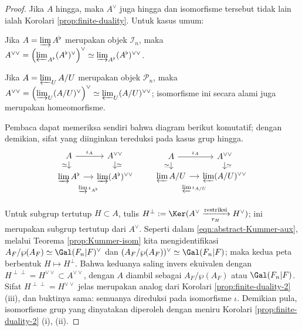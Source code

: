 \begin{proof}
	Jika $A$ hingga, maka $A^\vee$ juga hingga dan isomorfisme tersebut tidak lain ialah Korolari \ref{prop:finite-duality}. Untuk kasus umum:
	\begin{compactitem}
		\item Jika $A = \varinjlim A^\flat$ merupakan objek $\mathcal{I}_n$, maka $A^{\vee\vee} = \left( \varprojlim_{A^\flat} (A^\flat)^\vee\right)^\vee \simeq \varinjlim_{A^\flat} (A^\flat)^{\vee\vee}$.
		\item Jika $A = \varprojlim_U A/U$ merupakan objek $\mathcal{P}_n$, maka $A^{\vee\vee} = \left( \varinjlim_U (A/U)^\vee \right)^\vee \simeq \varprojlim_U (A/U)^{\vee\vee}$; isomorfisme ini secara alami juga merupakan homeomorfisme.
	\end{compactitem}
	Pembaca dapat memeriksa sendiri bahwa diagram berikut komutatif; dengan demikian, sifat yang diinginkan tereduksi pada kasus grup hingga.
	\[\begin{tikzcd}[row sep=small, column sep=small]
		A \arrow[r, "\iota_A"] \arrow[d, "\simeq"'] & A^{\vee\vee} \arrow[d, "\simeq"] \\
		\varinjlim A^\flat \arrow[r, "{\varinjlim \iota_{A^\flat}}"' inner sep=1em] & \varinjlim (A^\flat)^{\vee\vee}
	\end{tikzcd} \qquad
	\begin{tikzcd}[row sep=small, column sep=small]
		A \arrow[r, "\iota_A"] \arrow[d, "\simeq"'] & A^{\vee\vee} \arrow[d, "\simeq"] \\
		\varprojlim A/U \arrow[r, "{\varprojlim \iota_{A/U}}"' inner sep=1em] & \varprojlim (A/U)^{\vee\vee}
	\end{tikzcd}\]
	Untuk subgrup tertutup $H\subset A$, tulis $H^\perp:=\Ker(A^\vee\xrightarrow[r_H]{\text{restriksi}}H^\vee)$; ini merupakan subgrup tertutup dari $A^\vee$. Seperti dalam \eqref{eqn:abstract-Kummer-aux}, melalui Teorema \ref{prop:Kummer-isom} kita mengidentifikasi $A_F/\wp(A_F)\simeq\Gal(F_n|F)^\vee$ dan $(A_F/\wp(A_F))^\vee\simeq\Gal(F_n|F)$; maka kedua peta berbentuk $H\mapsto H^\perp$. Bahwa keduanya saling invers ekuivalen dengan $H^{\perp\perp}=H^{\vee\vee}\subset A^{\vee\vee}$, dengan $A$ diambil sebagai $A_F/\wp(A_F)$ atau $\Gal(F_n|F)$. Sifat $H^{\perp\perp}=H^{\vee\vee}$ jelas merupakan analog dari Korolari \ref{prop:finite-duality-2} (iii), dan buktinya sama: semuanya direduksi pada isomorfisme $\iota$. Demikian pula, isomorfisme grup yang dinyatakan diperoleh dengan meniru Korolari \ref{prop:finite-duality-2} (i), (ii).
\end{proof}

